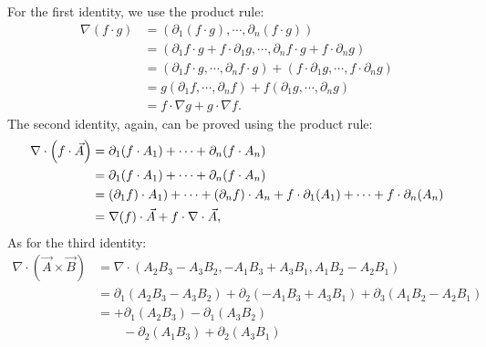 \documentclass[11pt]{article}
\begin{document}
\begin{solution}
    For the first identity, we use the product rule:
    \begin{align*}
        \nabla\left( f \cdot g \right)
        &= 
        \left( \partial_1 ( f \cdot g ), \cdots, \partial_n ( f \cdot g ) \right)
        \\&= 
        \left( \partial_1 f \cdot g + f \cdot \partial_1 g, \cdots, \partial_n f \cdot g + f \cdot \partial_n g \right)
        \\&= 
        \left( \partial_1 f \cdot g, \cdots, \partial_n f \cdot g \right)
        +
        \left( f \cdot \partial_1 g, \cdots, f \cdot \partial_n g \right)
        \\&= 
        g \left( \partial_1 f, \cdots, \partial_n f \right)
        +
        f \left( \partial_1 g, \cdots, \partial_n g \right)
        \\&= 
        f \cdot \nabla g
        +
        g \cdot \nabla f
        .
    \end{align*}
    The second identity, again, can be proved using the product rule:
    \begin{align*}
        \nabla\cdot\left( f \cdot \vec{A} \right)
        &= 
        \partial_1 ( f \cdot A_{1} ) + \cdots + \partial_n ( f \cdot A_{n} )
        \\&= 
        \partial_1 ( f \cdot A_{1} ) + \cdots + \partial_n ( f \cdot A_{n} )
        \\&= 
        ( \partial_1 f ) \cdot A_{1} ) + \cdots + ( \partial_n f ) \cdot A_{n}
        +
        f \cdot \partial_1 ( A_{1} ) + \cdots + f \cdot \partial_n ( A_{n} )
        \\&= 
        \nabla(f) \cdot \vec{A}
        +
        f \cdot \nabla \cdot \vec{A}
        ,
    \end{align*}
    As for the third identity:
    \begin{align*}
        \nabla\cdot\left( \vec{A} \times \vec{B} \right)
        &=
        \nabla\cdot\left( 
            A_2 B_3 - A_3 B_2,
          - A_1 B_3 + A_3 B_1,
            A_1 B_2 - A_2 B_1 
        \right)
        \\&=
        \partial_1\left(   A_2 B_3 - A_3 B_2 \right) + \partial_2\left( - A_1 B_3 + A_3 B_1 \right) + \partial_3\left(   A_1 B_2 - A_2 B_1 \right)
        \\&=
        + \partial_1\left( A_2 B_3 \right) - \partial_1\left( A_3 B_2 \right) 
        \\&\qquad
        - \partial_2\left( A_1 B_3 \right) + \partial_2\left( A_3 B_1 \right) 

\end{align*}
\end{solution}
\end{document}
